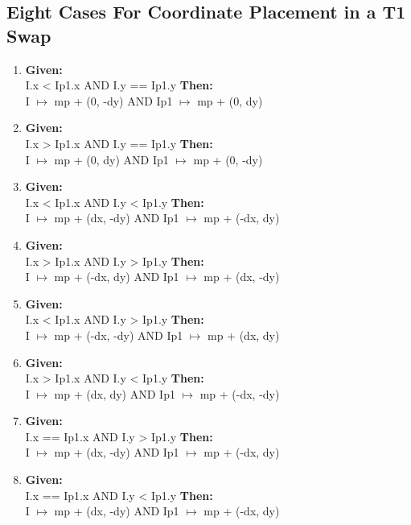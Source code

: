 \subsection{Eight Cases For Coordinate Placement in a T1 Swap}

\begin{enumerate}
\item %
\textbf{Given:}\\
I.x < Ip1.x AND I.y == Ip1.y
\textbf{Then:}\\
I $\mapsto$ mp + (0, -dy) AND Ip1 $\mapsto$ mp + (0, dy)

\item %
\textbf{Given:}\\
I.x > Ip1.x AND I.y == Ip1.y
\textbf{Then:}\\
I $\mapsto$ mp + (0, dy) AND Ip1 $\mapsto$ mp + (0, -dy)


\item %
\textbf{Given:}\\
I.x < Ip1.x AND I.y < Ip1.y
\textbf{Then:}\\
I $\mapsto$ mp + (dx, -dy) AND Ip1 $\mapsto$ mp + (-dx, dy)

\item %
\textbf{Given:}\\
I.x > Ip1.x AND I.y > Ip1.y
\textbf{Then:}\\
I $\mapsto$ mp + (-dx, dy) AND Ip1 $\mapsto$ mp + (dx, -dy)
\item %
\textbf{Given:}\\
I.x < Ip1.x AND I.y > Ip1.y
\textbf{Then:}\\
I $\mapsto$ mp + (-dx, -dy) AND Ip1 $\mapsto$ mp + (dx, dy)

\item %
\textbf{Given:}\\
I.x > Ip1.x AND I.y < Ip1.y
\textbf{Then:}\\
I $\mapsto$ mp + (dx, dy) AND Ip1 $\mapsto$ mp + (-dx, -dy)
\item %
\textbf{Given:}\\
I.x == Ip1.x AND I.y > Ip1.y
\textbf{Then:}\\
I $\mapsto$ mp + (dx, -dy) AND Ip1 $\mapsto$ mp + (-dx, dy)

\item %
\textbf{Given:}\\
I.x == Ip1.x AND I.y < Ip1.y
\textbf{Then:}\\
I $\mapsto$ mp + (dx, -dy) AND Ip1 $\mapsto$ mp + (-dx, dy)
\end{enumerate}
